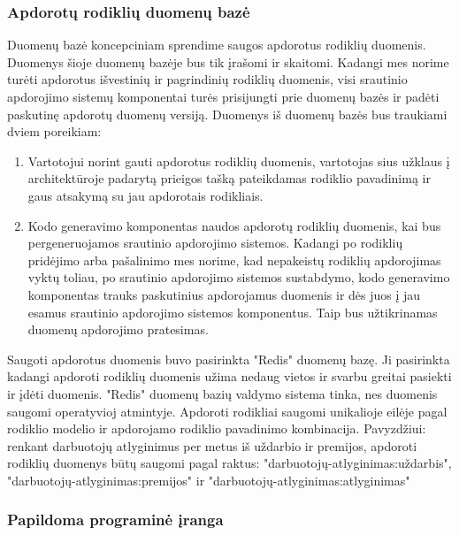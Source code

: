 \documentclass{VUMIFPSbakalaurinis}
\begin{document}
\subsubsection{Apdorotų rodiklių duomenų bazė}

Duomenų bazė koncepciniam sprendime saugos apdorotus rodiklių duomenis. Duomenys šioje duomenų bazėje bus tik įrašomi ir skaitomi. Kadangi mes norime turėti apdorotus išvestinių ir pagrindinių rodiklių duomenis, visi srautinio apdorojimo sistemų komponentai turės prisijungti prie duomenų bazės ir padėti paskutinę apdorotų duomenų versiją. Duomenys iš duomenų bazės bus traukiami dviem poreikiam: 
\begin{enumerate}
    \item Vartotojui norint gauti apdorotus rodiklių duomenis, vartotojas sius užklaus į architektūroje padarytą prieigos tašką pateikdamas rodiklio pavadinimą ir gaus atsakymą su jau apdorotais rodikliais. 
    \item Kodo generavimo komponentas naudos apdorotų rodiklių duomenis, kai bus pergeneruojamos srautinio apdorojimo sistemos.  Kadangi po rodiklių pridėjimo arba pašalinimo mes norime, kad nepakeistų rodiklių apdorojimas vyktų toliau, po srautinio apdorojimo sistemos sustabdymo, kodo generavimo komponentas trauks paskutinius apdorojamus duomenis ir dės juos į jau esamus srautinio apdorojimo sistemos komponentus. Taip bus užtikrinamas duomenų apdorojimo pratesimas.   
\end{enumerate}  

Saugoti apdorotus duomenis buvo pasirinkta "Redis" duomenų bazę. Ji pasirinkta kadangi apdoroti rodiklių duomenis užima nedaug vietos ir svarbu greitai pasiekti ir įdėti duomenis. "Redis" duomenų bazių valdymo sistema tinka, nes duomenis saugomi operatyvioj atmintyje. Apdoroti rodikliai saugomi unikalioje eilėje pagal rodiklio modelio ir apdorojamo rodiklio pavadinimo kombinacija. Pavyzdžiui: renkant darbuotojų atlyginimus per metus iš uždarbio ir premijos, apdoroti rodiklių duomenys būtų saugomi pagal raktus: "darbuotojų-atlyginimas:uždarbis", "darbuotojų-atlyginimas:premijos" ir "darbuotojų-atlyginimas:atlyginimas"


\subsubsection{Papildoma programinė įranga}
\end{document}
